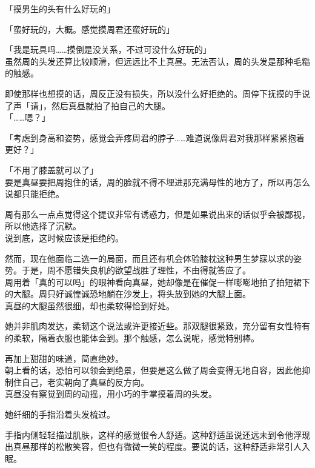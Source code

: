 「摸男生的头有什么好玩的」

「蛮好玩的，大概。感觉摸周君还蛮好玩的」

「我是玩具吗……摸倒是没关系，不过可没什么好玩的」\\

虽然周的头发还算比较顺滑，但远远比不上真昼。无法否认，周的头发是那种毛糙的触感。

即使那样也想摸的话，周反正没有损失，所以没什么好拒绝的。周停下抚摸的手说了声「请」，然后真昼就拍了拍自己的大腿。\\

「……嗯？」

「考虑到身高和姿势，感觉会弄疼周君的脖子……难道说像周君对我那样紧紧抱着更好？」

「不用了膝盖就可以了」\\

要是真昼要把周抱住的话，周的脸就不得不埋进那充满母性的地方了，所以再怎么说都只能拒绝。

周有那么一点点觉得这个提议非常有诱惑力，但是如果说出来的话似乎会被鄙视，所以他选择了沉默。\\

说到底，这时候应该是拒绝的。

然而，现在他面临二选一的局面，而且还有机会体验膝枕这种男生梦寐以求的姿势。于是，周不愿错失良机的欲望战胜了理性，不由得就答应了。\\

周用着「真的可以吗」的眼神看向真昼，她却像是在催促一样嘭嘭地拍了拍短裙下的大腿。周只好诚惶诚恐地躺在沙发上，将头放到她的大腿上面。\\

真昼的大腿虽然很细，却也柔软得恰到好处。

她并非肌肉发达，柔韧这个说法或许更接近些。那双腿很紧致，充分留有女性特有的柔软，隔着衣服也能体会到。那个触感，怎么说呢，感觉特别棒。

再加上甜甜的味道，简直绝妙。\\

朝上看的话，恐怕可以领会到绝景，但要是这么做了周会变得无地自容，因此他抑制住自己，老实朝向了真昼的反方向。\\

真昼没有察觉到周的动摇，用小巧的手掌摸着周的头发。

她纤细的手指沿着头发梳过。

手指内侧轻轻描过肌肤，这样的感觉很令人舒适。这种舒适虽说还远未到令他浮现出真昼那样的松散笑容，但也有微微一笑的程度。要说的话，这种舒适非常引人入眠。\\

